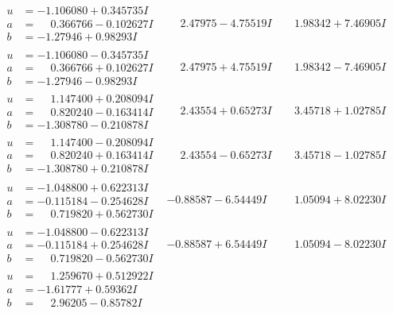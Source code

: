\documentclass[1p]{elsarticle_modified}
\theoremstyle{definition}
\begin{document}
$$\begin{array}{c|c|c}
\begin{aligned}
u &= -1.106080 + 0.345735 I \\
a &= \phantom{-}0.366766 - 0.102627 I \\
b &= -1.27946 + 0.98293 I\end{aligned}
 & \phantom{-}2.47975 - 4.75519 I & \phantom{-}1.98342 + 7.46905 I \\ \hline\begin{aligned}
u &= -1.106080 - 0.345735 I \\
a &= \phantom{-}0.366766 + 0.102627 I \\
b &= -1.27946 - 0.98293 I\end{aligned}
 & \phantom{-}2.47975 + 4.75519 I & \phantom{-}1.98342 - 7.46905 I \\ \hline\begin{aligned}
u &= \phantom{-}1.147400 + 0.208094 I \\
a &= \phantom{-}0.820240 - 0.163414 I \\
b &= -1.308780 - 0.210878 I\end{aligned}
 & \phantom{-}2.43554 + 0.65273 I & \phantom{-}3.45718 + 1.02785 I \\ \hline\begin{aligned}
u &= \phantom{-}1.147400 - 0.208094 I \\
a &= \phantom{-}0.820240 + 0.163414 I \\
b &= -1.308780 + 0.210878 I\end{aligned}
 & \phantom{-}2.43554 - 0.65273 I & \phantom{-}3.45718 - 1.02785 I \\ \hline\begin{aligned}
u &= -1.048800 + 0.622313 I \\
a &= -0.115184 - 0.254628 I \\
b &= \phantom{-}0.719820 + 0.562730 I\end{aligned}
 & -0.88587 - 6.54449 I & \phantom{-}1.05094 + 8.02230 I \\ \hline\begin{aligned}
u &= -1.048800 - 0.622313 I \\
a &= -0.115184 + 0.254628 I \\
b &= \phantom{-}0.719820 - 0.562730 I\end{aligned}
 & -0.88587 + 6.54449 I & \phantom{-}1.05094 - 8.02230 I \\ \hline\begin{aligned}
u &= \phantom{-}1.259670 + 0.512922 I \\
a &= -1.61777 + 0.59362 I \\
b &= \phantom{-}2.96205 - 0.85782 I\end{aligned}

\end{array}$$
\end{document}
